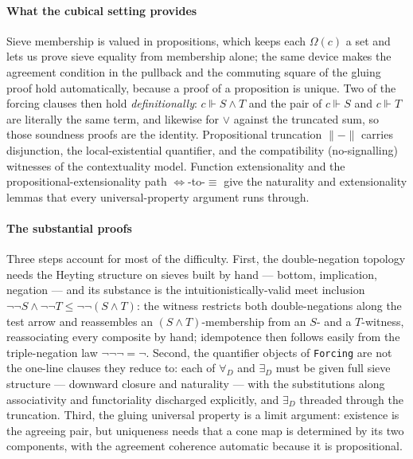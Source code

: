 \documentclass{lmcs}
\newcommand{\Om}{\Omega}
\newcommand{\nn}{\neg\neg}
\begin{document}
\paragraph{What the cubical setting provides}
Sieve membership is valued in propositions, which keeps each $\Om(c)$ a set and lets us prove sieve equality from membership alone; the same device makes the agreement condition in the pullback and the commuting square of the gluing proof hold automatically, because a proof of a proposition is unique.
Two of the forcing clauses then hold \emph{definitionally}: $c \Vdash S \wedge T$ and the pair of $c\Vdash S$ and $c\Vdash T$ are literally the same term, and likewise for $\vee$ against the truncated sum, so those soundness proofs are the identity.
Propositional truncation $\lVert-\rVert$ carries disjunction, the local-existential quantifier, and the compatibility (no-signalling) witnesses of the contextuality model.
Function extensionality and the propositional-extensionality path $\Leftrightarrow$-to-$\equiv$ give the naturality and extensionality lemmas that every universal-property argument runs through.

\paragraph{The substantial proofs}
Three steps account for most of the difficulty.
First, the double-negation topology needs the Heyting structure on sieves built by hand --- bottom, implication, negation --- and its substance is the intuitionistically-valid meet inclusion $\nn S \wedge \nn T \le \nn(S\wedge T)$: the witness restricts both double-negations along the test arrow and reassembles an $(S\wedge T)$-membership from an $S$- and a $T$-witness, reassociating every composite by hand; idempotence then follows easily from the triple-negation law $\nn\neg = \neg$.
Second, the quantifier objects of \texttt{Forcing} are not the one-line clauses they reduce to: each of $\forall_D$ and $\exists_D$ must be given full sieve structure --- downward closure and naturality --- with the substitutions along associativity and functoriality discharged explicitly, and $\exists_D$ threaded through the truncation.
Third, the gluing universal property is a limit argument: existence is the agreeing pair, but uniqueness needs that a cone map is determined by its two components, with the agreement coherence automatic because it is propositional.
\end{document}

